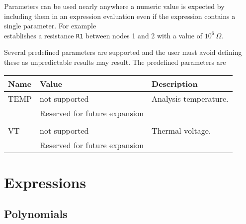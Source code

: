 Parameters can be used nearly anywhere a numeric value is expected
by including them in an expression evaluation even if the expression
contains a single parameter. For example
\hspace*{\fill}\\
establishes a resistance {\tt R1} between nodes 1 and 2 with a value of
$10^6~\Omega$.

Several predefined parameters are supported and the user must avoid
defining these as unpredictable results may result.
The predefined parameters are

{\offset\begin{tabular}{|l|l|l|}
\hline
{\bf Name} & {\bf Value}   &  {\bf Description}  \\
\hline
\hline
TEMP       & not supported & Analysis temperature.\\
           & Reserved for future expansion&\\
       & & \\
VT         & not supported & Thermal voltage.\\
           & Reserved for future expansion&\\
\hline
\end{tabular}
}


\section{Expressions \label{section:expression}}

{}

\subsection{Polynomials \label{section:poly}}

